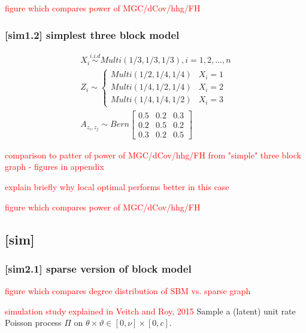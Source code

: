\documentclass[12pt]{article}
\theoremstyle{definition}
\begin{document}
\textcolor{red}{figure which compares power of MGC/dCov/hhg/FH}



\subsubsection{[sim1.2] simplest three block model}


\begin{equation}
\begin{gathered}
X_{i} \overset{i.i.d}{\sim} Multi(1/3, 1/3, 1/3), i = 1,2, ... , n \\ 
Z_{i}  \sim  \left\{  \begin{array}{ccc} Multi(1/2, 1/4, 1/4) & X_{i} = 1 \\ Multi(1/4, 1/2, 1/4) & X_{i} = 2 \\ Multi(1/4, 1/4, 1/2) & X_{i} = 3  \end{array} \right. \\
A_{z_{i}, z_{j}} \sim Bern \left[  \begin{array}{ccc}   0.5 & 0.2 &  0.3  \\ 0.2 & 0.5 & 0. 2  \\ 0.3 & 0.2 & 0.5  \end{array}  \right]
\end{gathered}
\end{equation}

\textcolor{red}{comparison to patter of power of MGC/dCov/hhg/FH from "simple" three block graph - figures in appendix}


\textcolor{red}{explain briefly why local optimal performs better in this case}


\textcolor{red}{figure which compares power of MGC/dCov/hhg/FH}


\subsection{[sim]}


\subsubsection{[sim2.1] sparse version of block model}



\textcolor{red}{figure which compares degree distribution of SBM vs. sparse graph}



\textcolor{red}{simulation study explained in Veitch and Roy, 2015}
Sample a (latent) unit rate Poisson process $\Pi$ on $\theta \times \vartheta \in [0, \nu] \times [0, c]$.
 
\end{document}
